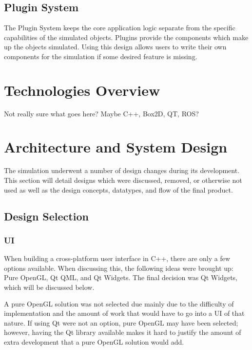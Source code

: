 \subsection{Plugin System}
The Plugin System keeps the core application logic separate from the specific capabilities of the simulated objects. Plugins provide the components which make up the objects simulated. Using this design allows users to write their own components for the simulation if some desired feature is missing.

\section{Technologies Overview}

Not really sure what goes here? Maybe C++, Box2D, QT, ROS?


 \section{Architecture and System Design}
 	The simulation underwent a number of design changes during its development. This section will detail designs which were discussed, removed, or otherwise not used as well as the design concepts, datatypes, and flow of the final product.
 	
 \subsection{Design Selection}
 \subsubsection{UI}
 	When building a cross-platform user interface in C++, there are only a few options available. When discussing this, the following ideas were brought up: Pure OpenGL, Qt QML, and Qt Widgets. The final decision was Qt Widgets, which will be discussed below.
 	
 	A pure OpenGL solution was not selected due mainly due to the difficulty of implementation and the amount of work that would have to go into a UI of that nature. If using Qt were not an option, pure OpenGL may have been selected; however, having the Qt library available makes it hard to justify the amount of extra development that a pure OpenGL solution would add.
 	
